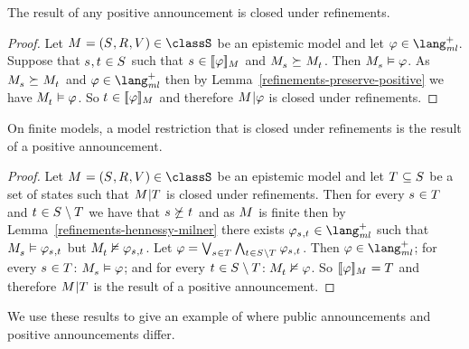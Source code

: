 \begin{lemma}\label{positive-announcements-refinement-closed}
    The result of any positive announcement is closed under refinements.
\end{lemma}

\begin{proof}
    Let $\kModelAndTuple \in \classS$ be an epistemic model and
    let $\phi \in \langMlPlus$.
    Suppose that $\kStateS, \kStateT \in \kStates$ such that $\kStateS \in \interpretation[\kModel]{\phi}$ and $\kPModel{\kStateS} \simulates \kPModel{\kStateT}$.
    Then $\kPModel{\kStateS} \entails \phi$.
    As $\kPModel{\kStateS} \simulates \kPModel{\kStateT}$ and $\phi \in \langMlPlus$ then by Lemma~\ref{refinements-preserve-positive} we have $\kPModel{\kStateT} \entails \phi$.
    So $\kStateT \in \interpretation[\kModel]{\phi}$ and therefore $\restrict{\kModel}{\phi}$ is closed under refinements.
\end{proof}

\begin{lemma}\label{refinement-closed-positive-announcements}
    On finite models, a model restriction that is closed under refinements is the result of a positive announcement.
\end{lemma}

\begin{proof}
    Let $\kModelAndTuple \in \classS$ be an epistemic model and
    let $\kStatesT \subseteq \kStates$ be a set of states such that $\restrict{\kModel}{\kStatesT}$ is closed under refinements.
    Then for every $\kStateS \in \kStatesT$ and $\kStateT \in \kStates \setminus \kStatesT$ we have that $\kStateS \not\simulates \kStateT$ and as $\kModel$ is finite then by Lemma~\ref{refinements-hennessy-milner} there exists $\phi_{\kStateS,\kStateT} \in \langMlPlus$ such that $\kPModel{\kStateS} \entails \phi_{\kStateS,\kStateT}$ but $\kPModel{\kStateT} \nentails \phi_{\kStateS,\kStateT}$.
    Let $\phi = \bigvee_{\kStateS \in \kStatesT} \bigwedge_{\kStateT \in \kStates \setminus \kStatesT} \phi_{\kStateS, \kStateT}$.
    Then $\phi \in \langMlPlus$; 
    for every $\kStateS \in \kStatesT$: $\kPModel{\kStateS} \entails \phi$; 
    and for every $\kStateT \in \kStates \setminus \kStatesT$: $\kPModel{\kStateT} \nentails \phi$.
    So $\interpretation[\kModel]{\phi} = \kStatesT$ and therefore $\restrict{\kModel}{\kStatesT}$ is the result of a positive announcement.
\end{proof}

We use these results to give an example of where public announcements and positive announcements differ.

